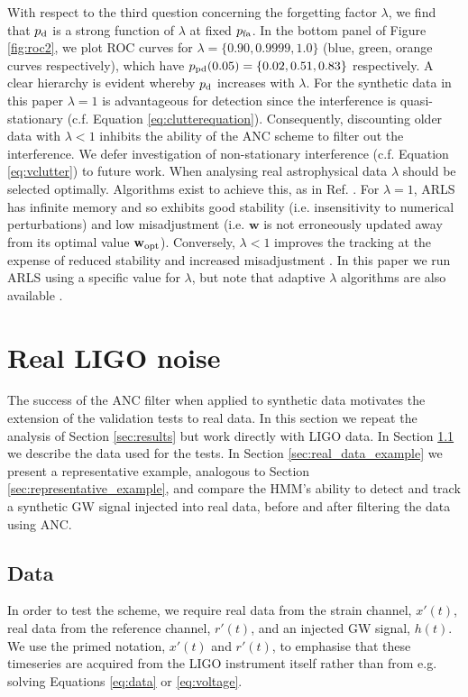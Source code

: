 \documentclass[pra,superscriptaddress,reprint,amsmath,amssymb,nofootinbib]{revtex4-2}
\begin{document}
With respect to the third question concerning the forgetting factor $\lambda$, we find that $p_{\rm d}$ is a strong function of $\lambda$ at fixed $p_{\rm fa}$. In the bottom panel of Figure \ref{fig:roc2}, we plot ROC curves for $\lambda = \{0.90,0.9999,1.0\}$ (blue, green, orange curves respectively), which have $p_{\rm pd} (0.05) = \{0.02, 0.51, 0.83\}$ respectively. A clear hierarchy is evident whereby $p_{\rm d}$ increases with $\lambda$. For the synthetic data in this paper $\lambda=1$ is advantageous for detection since the interference is quasi-stationary (c.f. Equation \ref{eq:clutterequation}). Consequently, discounting older data with $\lambda < 1$ inhibits the ability of the ANC scheme to filter out the interference. We defer investigation of non-stationary interference (c.f. Equation \ref{eq:vclutter}) to future work. When analysing real astrophysical data $\lambda$ should be selected optimally. Algorithms exist to achieve this, as in Ref. \citep{6349749}. For $\lambda = 1$, ARLS has infinite memory and so exhibits good stability (i.e. insensitivity to numerical perturbations) and low misadjustment (i.e. $\mathbf{w}$ is not erroneously updated away from its optimal value $\mathbf{w}_{\rm opt}$). Conversely, $\lambda < 1$ improves the tracking at the expense of reduced stability and increased misadjustment \citep{Ciochina5206117}. In this paper we run ARLS using a specific value for $\lambda$, but note that adaptive $\lambda$ algorithms are also available \citep{app12042077,1468506,4639569}. \newline 



\section{Real LIGO noise}\label{sec:real_data}
The success of the ANC filter when applied to synthetic data motivates the extension of the validation tests to real data. In this section we repeat the analysis of Section \ref{sec:results} but work directly with LIGO data. In Section \ref{sec:real_data_generation} we describe the data used for the tests. In Section \ref{sec:real_data_example} we present a representative example, analogous to Section \ref{sec:representative_example}, and compare the HMM's ability to detect and track a synthetic GW signal injected into real data, before and after filtering the data using ANC. 



\subsection{Data}\label{sec:real_data_generation}
In order to test the scheme, we require real data from the strain channel, $x'(t)$, real data from the reference channel, $r'(t)$, and an injected GW signal, $h(t)$. We use the primed notation, $x'(t)$ and $r'(t)$, to emphasise that these timeseries are acquired from the LIGO instrument itself rather than from e.g. solving Equations \eqref{eq:data} or \eqref{eq:voltage}. \newline 
\end{document}
